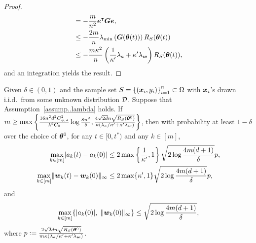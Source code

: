 \documentclass[twoside,11pt]{article}
\begin{document}
\begin{proof}
\begin{equation*}
\begin{aligned}
             & =-\frac{m}{n^2}\bm{e}^{\intercal}\bm{G}\bm{e},                                                                                                                                                  \\
             & \leq -\frac{2m}{n}\lambda_{\min}\left(\bm{G}(\bm{\theta}(t))\right)R_S(\bm{\theta}(t))                                                                                                     \\
             & \leq -\frac{m\kappa^2}{n}\left(\frac{1}{\kappa'}\lambda_a+\kappa'\lambda_{\bm{w}}\right)R_S(\bm{\theta}(t)),
        \end{aligned}
    \end{equation*}
    and an integration yields the result.
\end{proof}

\begin{prop}\label{prop:a_w}
    Given $\delta\in(0,1)$ and the sample set $S = {\{(\bm{x}_i, y_i)\}}_{i=1}^n\subset\Omega$ with $\bm{x}_i$'s drawn i.i.d.\ from some unknown distribution $\mathcal{D}$. Suppose that Assumption~\ref{assump..lambda} holds. If $m\geq\max\left\{\frac{16n^2d^2C_{\psi,d}^2}{\lambda^2C_0}\log\frac{8n^2}{\delta}, \frac{4\sqrt{2d}n\sqrt{R_S(\bm{\theta}^0)}}{\kappa\left(\lambda_a/\kappa'+\kappa'\lambda_{\bm{w}}\right)}\right\}$, then with probability at least $1-\delta$ over the choice of $\bm{\theta}^0$, for any $t\in[0, t^\ast)$ and any $k\in [m]$,
    \begin{align}
        \max\limits_{k\in[m]}\lvert a_k(t) - a_k(0)\rvert
         & \leq 2\max\left\{\frac{1}{\kappa'},1\right\}\sqrt{2\log\frac{4m(d+1)}{\delta}}p, \\
        \max\limits_{k\in[m]}\lVert\bm{w}_k(t) - \bm{w}_k(0)\rVert_{\infty}
         & \leq 2\max\{
        \kappa',1\}\sqrt{2\log\frac{4m(d+1)}{\delta}}p,
    \end{align}
    and
    \begin{equation}
        \max\limits_{k\in[m]}\{\lvert a_k(0)\rvert,\;\lVert\bm{w}_k(0)\rVert_{\infty}\} \leq \sqrt{2\log\frac{4m(d+1)}{\delta}},
    \end{equation}
    where $p := \frac{2\sqrt{2}dn\sqrt{R_S(\bm{\theta}^0)}}{m\kappa\left(\lambda_a/\kappa'+\kappa'\lambda_{\bm{w}}\right)}$.
\end{prop}
\end{document}
